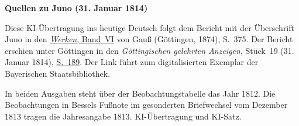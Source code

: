 \clearpage\thispagestyle{empty}
\begin{center}\textbf{Quellen zu Juno (31. Januar 1814)}\end{center}
\noindent Diese KI-Übertragung ins heutige Deutsch folgt dem Bericht mit der Überschrift Juno in den \href{https://gdz.sub.uni-goettingen.de/id/PPN236007467}{\textit{Werken}, Band~VI} von Gauß (Göttingen, 1874), S.~375. Der Bericht erschien unter Göttingen in den \textit{Göttingischen gelehrten Anzeigen}, Stück~19 (31. Januar 1814), \href{https://api.digitale-sammlungen.de/iiif/image/v2/bsb10538685_00195/full/1600,/0/default.jpg}{S.~189}. Der Link führt zum digitalisierten Exemplar der Bayerischen Staatsbibliothek.
\par\smallskip\noindent In beiden Ausgaben steht über der Beobachtungstabelle das Jahr 1812. Die Beobachtungen in Bessels Fußnote im gesonderten Briefwechsel vom Dezember 1813 tragen die Jahresangabe 1813. KI-Übertragung und KI-Satz.
\clearpage
